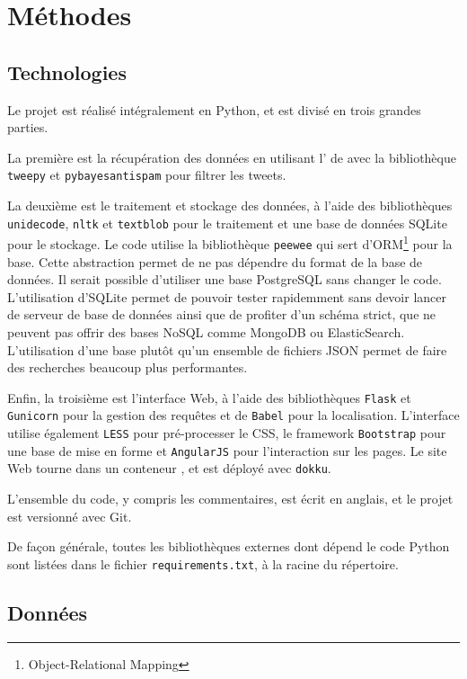 
\section{Méthodes}

\subsection{Technologies}

Le projet est réalisé intégralement en Python, et est divisé en trois grandes
parties.

La première est la récupération des données en utilisant l’\api{} de \twt{}
avec la bibliothèque \verb|tweepy| et \verb|pybayesantispam| pour filtrer les
tweets.

La deuxième est le traitement et stockage des données, à l’aide des
bibliothèques \verb|unidecode|, \verb|nltk| et \verb|textblob| pour le
traitement et une base de données SQLite pour le stockage. Le code utilise la
bibliothèque \verb|peewee| qui sert d’ORM\footnote{Object-Relational Mapping}
pour la base. Cette abstraction permet de ne pas dépendre du format de la base
de données. Il serait possible d’utiliser une base PostgreSQL sans changer le
code. L’utilisation d’SQLite permet de pouvoir tester rapidemment sans devoir
lancer de serveur de base de données ainsi que de profiter d’un schéma strict,
que ne peuvent pas offrir des bases NoSQL comme MongoDB ou ElasticSearch.
L’utilisation d’une base plutôt qu’un ensemble de fichiers JSON permet de faire
des recherches beaucoup plus performantes.

Enfin, la troisième est l’interface Web, à l’aide des bibliothèques
\verb|Flask| et \verb|Gunicorn| pour la gestion des requêtes et de \verb|Babel|
pour la localisation. L’interface utilise également \verb|LESS| pour
pré-processer le CSS, le framework \verb|Bootstrap| pour une base de mise en
forme et \verb|AngularJS| pour l’interaction sur les pages. Le site Web tourne
dans un conteneur , et est déployé avec \verb|dokku|.

L’ensemble du code, y compris les commentaires, est écrit en anglais, et le
projet est versionné avec Git.

De façon générale, toutes les bibliothèques externes dont dépend le code Python
sont listées dans le fichier \verb|requirements.txt|, à la racine du
répertoire.

\subsection{Données}

